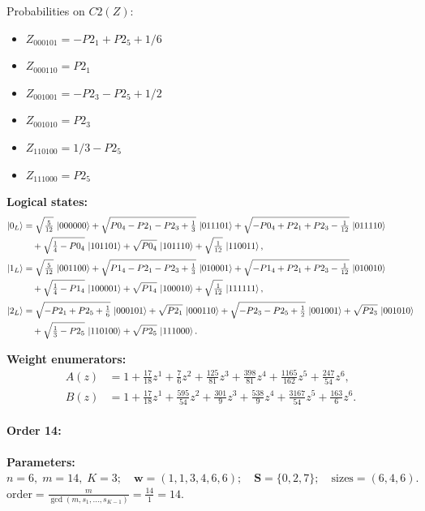 \documentclass[11pt]{article}
\begin{document}
Probabilities on $C2 (Z)$:
\begin{itemize}
    \item $Z_{000101} = -P2_1 + P2_5 + 1/6$
    \item $Z_{000110} = P2_1$
    \item $Z_{001001} = -P2_3 - P2_5 + 1/2$
    \item $Z_{001010} = P2_3$
    \item $Z_{110100} = 1/3 - P2_5$
    \item $Z_{111000} = P2_5$
\end{itemize}

\noindent\textbf{Logical states:}
\begin{align*}
\ket{0_L} &= \sqrt{\tfrac{5}{12}}\,\ket{000000} + \sqrt{P0_4 - P2_1 - P2_3 + \tfrac{1}{3}}\,\ket{011101} + \sqrt{-P0_4 + P2_1 + P2_3 - \tfrac{1}{12}}\,\ket{011110}\\
&\quad + \sqrt{\tfrac{1}{4} - P0_4}\,\ket{101101} + \sqrt{P0_4}\,\ket{101110} + \sqrt{\tfrac{1}{12}}\,\ket{110011},
\\[2pt]
\ket{1_L} &= \sqrt{\tfrac{5}{12}}\,\ket{001100} + \sqrt{P1_4 - P2_1 - P2_3 + \tfrac{1}{3}}\,\ket{010001} + \sqrt{-P1_4 + P2_1 + P2_3 - \tfrac{1}{12}}\,\ket{010010}\\
&\quad + \sqrt{\tfrac{1}{4} - P1_4}\,\ket{100001} + \sqrt{P1_4}\,\ket{100010} + \sqrt{\tfrac{1}{12}}\,\ket{111111},
\\[2pt]
\ket{2_L} &= \sqrt{-P2_1 + P2_5 + \tfrac{1}{6}}\,\ket{000101} + \sqrt{P2_1}\,\ket{000110} + \sqrt{-P2_3 - P2_5 + \tfrac{1}{2}}\,\ket{001001} + \sqrt{P2_3}\,\ket{001010}\\
&\quad + \sqrt{\tfrac{1}{3} - P2_5}\,\ket{110100} + \sqrt{P2_5}\,\ket{111000}.
\end{align*}

\noindent\textbf{Weight enumerators:}
\begin{align*}
A(z) &= 1 + \tfrac{17}{18}z^{1} + \tfrac{7}{6}z^{2} + \tfrac{125}{81}z^{3} + \tfrac{398}{81}z^{4} + \tfrac{1165}{162}z^{5} + \tfrac{247}{54}z^{6},\\[2pt]
B(z) &= 1 + \tfrac{17}{18}z^{1} + \tfrac{595}{54}z^{2} + \tfrac{301}{9}z^{3} + \tfrac{538}{9}z^{4} + \tfrac{3167}{54}z^{5} + \tfrac{163}{6}z^{6}.
\end{align*}

\paragraph{\textbf{Order 14:}}
\noindent\textbf{Parameters:} $n=6,\; m=14,\; K=3;\quad \mathbf w=(1, 1, 3, 4, 6, 6);\quad \mathbf S=\{0, 2, 7\};\quad \text{sizes}=\left(6, 4, 6\right).$ $\displaystyle \text{order}=\frac{m}{\gcd(m,s_1,\dots,s_{K-1})}=\frac{14}{1}=14.$
\end{document}
